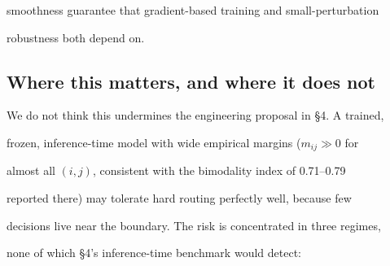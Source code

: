 \documentclass[11pt]{article}
\theoremstyle{definition}
\begin{document}
smoothness guarantee that gradient-based training and small-perturbation





robustness both depend on.











\subsection{Where this matters, and where it does not}











We do not think this undermines the engineering proposal in \S4. A trained,





frozen, inference-time model with wide empirical margins ($m_{ij} \gg 0$ for





almost all $(i,j)$, consistent with the bimodality index of 0.71--0.79





reported there) may tolerate hard routing perfectly well, because few





decisions live near the boundary. The risk is concentrated in three regimes,





none of which \S4's inference-time benchmark would detect:
\end{document}
